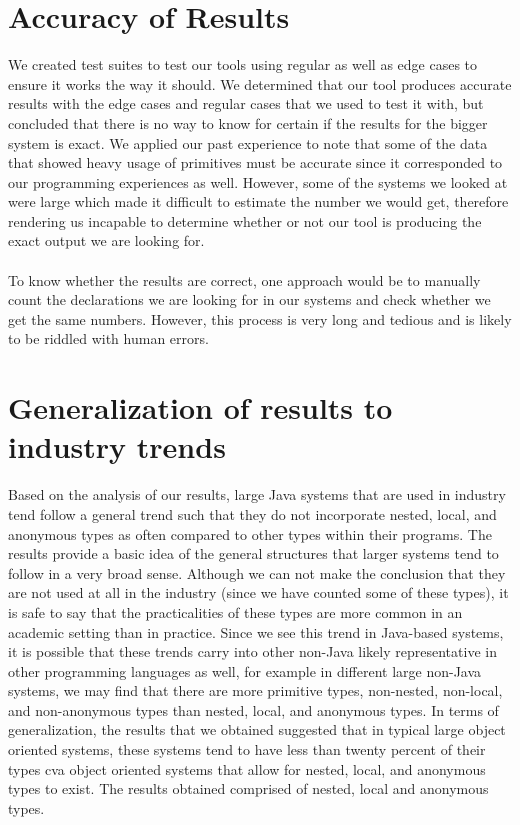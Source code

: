 \documentclass{assignment}
\begin{document}
\section*{Accuracy of Results}

We created test suites to test our tools using regular as well as edge cases to ensure it works the way it should. We determined that our tool produces accurate results with the edge cases and regular cases that we used to test it with, but concluded that there is no way to know for certain if the results for the bigger system is exact. We applied our past experience to note that some of the data that showed heavy usage of primitives must be accurate since it corresponded to our programming experiences as well. However, some of the systems we looked at were large which made it difficult to estimate the number we would get, therefore rendering us incapable to determine whether or not our tool is producing the exact output we are looking for. \\
\\To know whether the results are correct, one approach would be to manually count the declarations we are looking for in our systems and check whether we get the same numbers. However, this process is very long and tedious and is likely to be riddled with human errors. 

\section*{Generalization of results to industry trends}

Based on the analysis of our results, large Java systems that are used in industry tend follow a general trend such that they do not incorporate nested, local, and anonymous types as often compared to other types within their programs. The results provide a basic idea of the general structures that larger systems tend to follow in a very broad sense. Although we can not make the conclusion that they are not used at all in the industry (since we have counted some of these types), it is safe to say that the practicalities of these types are more common in an academic setting than in practice. Since we see this trend in Java-based systems, it is possible that these trends carry into other non-Java likely representative in other programming languages as well, for example in different large non-Java systems, we may find that there are more primitive types, non-nested, non-local, and non-anonymous types than nested, local, and anonymous types. In terms of generalization, the results that we obtained suggested that in typical large object oriented systems, these systems tend to have less than twenty percent of their types cva object oriented systems that allow for nested, local, and anonymous types to exist. The results obtained comprised of nested, local and anonymous types.\\
\end{document}
